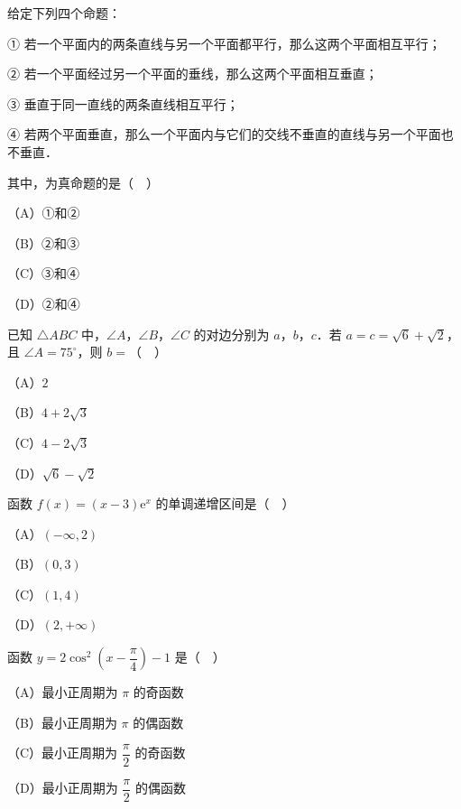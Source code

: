 \begin{question}
给定下列四个命题：

① 若一个平面内的两条直线与另一个平面都平行，那么这两个平面相互平行；

② 若一个平面经过另一个平面的垂线，那么这两个平面相互垂直；

③ 垂直于同一直线的两条直线相互平行；

④ 若两个平面垂直，那么一个平面内与它们的交线不垂直的直线与另一个平面也不垂直．

其中，为真命题的是（　）

（A）①和②

（B）②和③

（C）③和④

（D）②和④

\end{question}
\begin{question}
已知 $\triangle ABC$ 中，$\angle A$，$\angle B$，$\angle C$ 的对边分别为 $a$，$b$，$c$．若 $a=c=\sqrt6+\sqrt2$，且 $\angle A=75^\circ$，则 $b=$（　）

（A）$2$

（B）$4+2\sqrt3$

（C）$4-2\sqrt3$

（D）$\sqrt6-\sqrt2$

\end{question}
\begin{question}
函数 $f(x)=(x-3)\mathrm e^x$ 的单调递增区间是（　）

（A）$(-\infty,2)$

（B）$(0,3)$

（C）$(1,4)$

（D）$(2,+\infty)$

\end{question}
\begin{question}
函数 $y=2\cos^2\left(x-\dfrac{\pi}{4}\right)-1$ 是（　）

（A）最小正周期为 $\pi$ 的奇函数

（B）最小正周期为 $\pi$ 的偶函数

（C）最小正周期为 $\dfrac{\pi}{2}$ 的奇函数

（D）最小正周期为 $\dfrac{\pi}{2}$ 的偶函数

\end{question}
